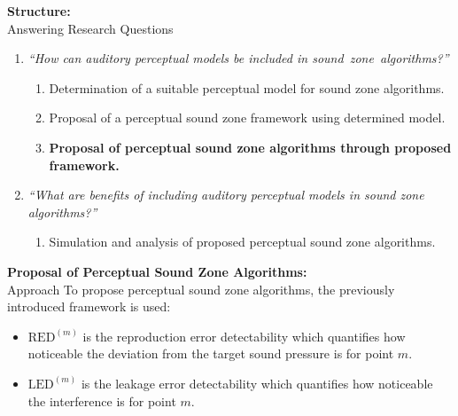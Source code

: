 \documentclass[aspectratio=169]{beamer}
\begin{document}
\begin{frame}{\textbf{Structure:}\\ Answering Research Questions}
    \begin{enumerate}
        \item {\textit{``How can auditory perceptual models be included in sound~zone~algorithms?''}}
            \vspace{7pt}
            \begin{enumerate}
                \item Determination of a suitable perceptual model for sound zone algorithms.
                \vspace{7pt}
                \item Proposal of a perceptual sound zone framework using determined model. 
                \vspace{7pt}
                \item \textbf{Proposal of perceptual sound zone algorithms through proposed framework.}
                \vspace{7pt}
            \end{enumerate}
        \item {\textit{``What are benefits of including auditory perceptual models in sound zone algorithms?''}}
            \vspace{-5pt}
            \begin{enumerate}
                \item Simulation and analysis of proposed perceptual sound zone algorithms.
            \end{enumerate}
    \end{enumerate}
\end{frame}

\begin{frame}{\textbf{Proposal of Perceptual Sound Zone Algorithms:}\\ Approach}
    To propose perceptual sound zone algorithms, the previously introduced framework is used:
    \begin{itemize}
        \item $\textrm{RED}^{(m)}$ is the reproduction error detectability which quantifies how
            noticeable the deviation from the target sound pressure is for point $m$.
        \item $\textrm{LED}^{(m)}$ is the leakage error detectability which quantifies how
            noticeable the interference is for point $m$. 
    \end{itemize}
\end{frame}
\end{document}
